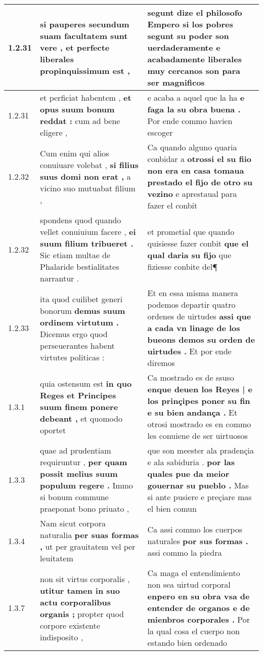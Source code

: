 \begin{tabular}{|p{1cm}|p{6.5cm}|p{6.5cm}|}
1.2.31 & si pauperes \textbf{ secundum suam facultatem sunt vere , } et perfecte liberales propinquissimum est , & segunt dize el philosofo \textbf{ Empero si los pobres segunt su poder son uerdaderamente } e acabadamente liberales muy cercanos son para ser magnificos \\\hline
1.2.31 & et perficiat habentem , \textbf{ et opus suum bonum reddat : } cum ad bene eligere , & e acaba a aquel que la ha \textbf{ e faga la su obra buena . } Por ende commo havien escoger \\\hline
1.2.32 & Cum enim qui alios conuiuare volebat , \textbf{ si filius suus domi non erat , } a vicino suo mutuabat filium , & Ca quando alguno quaria conbidar a \textbf{ otrossi el su fiio non era en casa tomaua prestado el fijo de otro su vezino } e aprestaual para fazer el conbit \\\hline
1.2.32 & spondens quod quando vellet conuiuium facere , \textbf{ ei suum filium tribueret . } Sic etiam multae de Phalaride bestialitates narrantur . & et prometial que quando quisiesse fazer conbit \textbf{ que el qual daria su fijo } que fiziesse conbite del¶ \\\hline
1.2.33 & ita quod cuilibet generi bonorum \textbf{ demus suum ordinem virtutum . } Dicemus ergo quod perseuerantes habent virtutes politicas : & Et en essa misma manera podemos departir quatro ordenes de uirtudes \textbf{ assi que a cada vn linage de los bueons demos su orden de uirtudes . } Et por ende diremos \\\hline
1.3.1 & quia ostensum est \textbf{ in quo Reges et Principes suum finem ponere debeant , } et quomodo oportet & Ca mostrado es de ssuso \textbf{ enque deuen los Reyes | e los prinçipes poner su fin e su bien andança . } Et otrosi mostrado es en commo les conuiene de ser uirtuosos \\\hline
1.3.3 & quae ad prudentiam requiruntur , \textbf{ per quam possit melius suum populum regere . } Immo si bonum commune praeponat bono priuato , & que son meester ala pradençia e ala sabiduria . \textbf{ por las quales pue da meior gouernar su pueblo . } Mas si ante pusiere e preçiare mas el bien comun \\\hline
1.3.4 & Nam sicut corpora naturalia \textbf{ per suas formas , } ut per grauitatem vel per leuitatem & Ca assi commo los cuerpos naturales \textbf{ por sus formas . } assi commo la piedra \\\hline
1.3.7 & non sit virtus corporalis , \textbf{ utitur tamen in suo actu corporalibus organis ; } propter quod corpore existente indisposito , & Ca maga el entendimiento non sea uirtud corporal \textbf{ enpero en su obra vsa de entender de organos e de mienbros corporales . } Por la qual cosa el cuerpo non estando bien ordenado \\\hline

\end{tabular}
